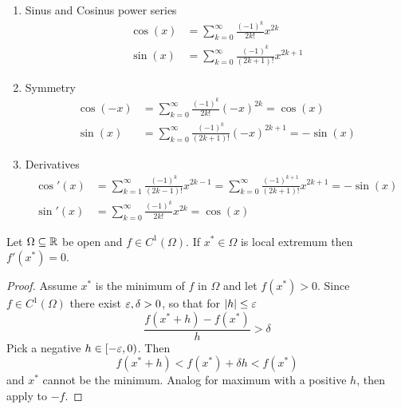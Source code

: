 \begin{lemma}\hfill
    \begin{enumerate}
        \item Sinus and Cosinus power series
              \[
                  \begin{split}
                      \cos(x) &= \sum_{k=0}^\infty \frac{{(-1)}^k}{2k!} x^{2k} \\
                      \sin(x) &= \sum_{k=0}^\infty \frac{{(-1)}^k}{(2k + 1)!} x^{2k + 1}
                  \end{split}
              \]
        \item Symmetry
              \[
                  \begin{split}
                      \cos(-x) &= \sum_{k=0}^\infty \frac{{(-1)}^k}{2k!} {(-x)}^{2k} = \cos(x) \\
                      \sin(x) &= \sum_{k=0}^\infty \frac{{(-1)}^k}{(2k + 1)!} {(-x)}^{2k + 1} = -\sin(x)
                  \end{split}
              \]
        \item Derivatives
              \[
                  \begin{split}
                      \cos'(x) &= \sum_{k=1}^\infty \frac{{(-1)}^k}{(2k - 1)!} x^{2k - 1}
                      = \sum_{k=0}^\infty \frac{{(-1)}^{k + 1}}{(2k + 1)!} x^{2k + 1} = -\sin(x) \\
                      \sin'(x) &= \sum_{k=0}^\infty \frac{{(-1)}^k}{2k!} {x}^{2k} = \cos(x)
                  \end{split}
              \]
    \end{enumerate}
\end{lemma}
\bigskip


\begin{theorem}\label{thm:fermat_stationary_point}
    Let \( \Omega \subseteq \mathbb{R} \) be open and \( f \in C^1(\Omega) \). If \( x^* \in \Omega \) is local extremum
    then \( f'(x^*) = 0 \).
\end{theorem}

\begin{proof}
    Assume \( x^* \) is the minimum of \( f \) in \( \Omega \) and let \( f(x^*) > 0 \).
    Since \( f \in C^1(\Omega) \) there exist \( \varepsilon, \delta > 0 \), so that for \( |h| \le \varepsilon \)
    \[
        \frac{f(x^* + h) - f(x^*)}{h} > \delta
    \]
    Pick a negative \( h \in [-\varepsilon, 0) \). Then   %
    \[
        f(x^* + h) < f(x^*) +  \delta h < f(x^*)
    \]
    and \( x^* \) cannot be the minimum. Analog for maximum with a positive \( h \), then apply to \( -f \).
\end{proof}
\bigskip


